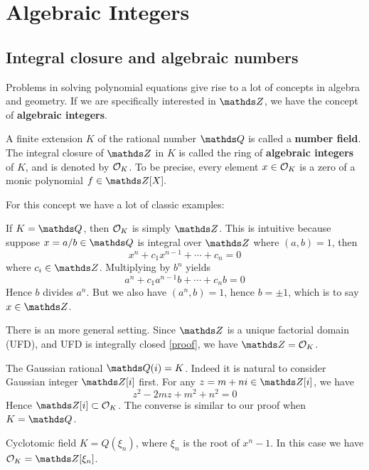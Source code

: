 \chapter{Algebraic Integers}
	\section{Integral closure and algebraic numbers}
		Problems in solving polynomial equations give rise to a lot of concepts in algebra and geometry. If we are specifically interested in $\mds{Z}$, we have the concept of \textbf{algebraic integers}.
		
		\begin{definition}
			A finite extension $K$ of the rational number $\mds{Q}$ is called a \textbf{number field}. The integral closure of $\mds{Z}$ in $K$ is called the ring of \textbf{algebraic integers} of $K$, and is denoted by $\mathcal{O}_K$. To be precise, every element $x \in \mathcal{O}_K$ is a zero of a monic polynomial $f \in \Z[X].$
		\end{definition}
	
		For this concept we have a lot of classic examples:
		
		\begin{example}
			If $K=\Q$, then $\mathcal{O}_K$ is simply $\Z$. This is intuitive because suppose $x=a/b \in \Q$ is integral over $\Z$ where $(a,b)=1$, then
			\[
				x^n+c_1x^{n-1}+\cdots+c_n = 0
			\]
			where $c_i \in \Z$. Multiplying by $b^n$ yields
			\[
				a^n+c_1a^{n-1}b+\cdots+c_nb = 0
			\]
			Hence $b$ divides $a^n$. But we also have $(a^n,b)=1$, hence $b=\pm 1$, which is to say $x \in \Z$.
			
			There is an more general setting. Since $\Z$ is a unique factorial domain (UFD), and UFD is integrally closed \href{https://proofwiki.org/wiki/Unique_Factorization_Domain_is_Integrally_Closed}{[proof]}, we have $\Z=\OK$. 
		\end{example}
	
		\begin{example}
			The Gaussian rational $\Q(i)=K$. Indeed it is natural to consider Gaussian integer $\Z[i]$ first. For any $z=m+ni \in \Z[i]$, we have
			\[
				z^2-2mz+m^2+n^2=0
			\]
			Hence $\Z[i] \subset \OK$. The converse is similar to our proof when $K=\Q$.
		\end{example}
	
		\begin{example}
			Cyclotomic field $K=Q(\xi_n)$, where $\xi_n$ is the root of $x^n-1$. In this case we have $\OK = \Z[\xi_n]$.
		\end{example}
		
